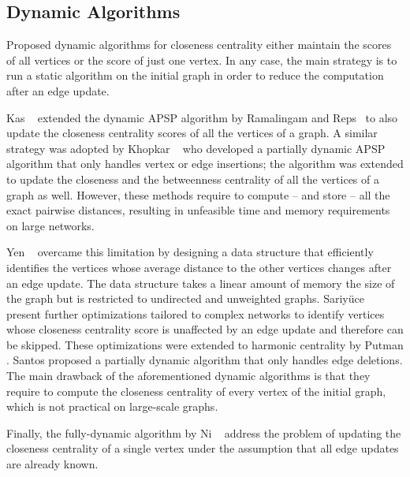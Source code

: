 \subsection{Dynamic Algorithms}
%
Proposed dynamic algorithms for closeness centrality either maintain the scores
of all vertices or the score of just one vertex. In any case, the main strategy is
to run a static algorithm on the initial graph in order to reduce the
computation after an edge update.

Kas \etal~\cite{DBLP:conf/asunam/KasCC13} extended the dynamic APSP algorithm by
Ramalingam and Reps~\cite{DBLP:journals/tcs/RamalingamR96} to also update the
closeness centrality scores of all the vertices of a graph.
A similar strategy was adopted by Khopkar \etal~\cite{DBLP:journals/snam/KhopkarNNB14}
who developed a partially dynamic APSP algorithm that only handles vertex or edge
insertions; the algorithm was extended to update the closeness and the
betweenness centrality of all the vertices of a graph as well.
However, these methods require to compute -- and store -- all the exact pairwise
distances, resulting in unfeasible time and memory requirements on large networks.

Yen \etal~\cite{DBLP:conf/icdm/YenYC13} overcame this limitation by designing a
data structure that efficiently identifies the vertices whose average distance
to the other vertices changes after an edge update. The data structure takes a
linear amount of memory \wrt the size of the graph but is restricted to
undirected and unweighted graphs.
%
Sariy\"uce
\etal~\cite{DBLP:conf/bigdataconf/SariyuceKSC13,DBLP:journals/pc/SariyuceSKC15,
DBLP:journals/corr/abs-1303-0422}
present further optimizations tailored to complex networks to identify
vertices whose closeness centrality score is unaffected by an edge update and
therefore can be skipped. These optimizations were extended to harmonic
centrality by Putman \etal \cite{DBLP:conf/asunam/PutmanBT19}.
Santos \etal \cite{DBLP:conf/ipps/SantosKMS16} proposed a partially
dynamic algorithm that only handles edge deletions.
The main drawback of the aforementioned dynamic algorithms is that they require
to compute the closeness centrality of every vertex of the initial graph,
which is not practical on large-scale graphs.

Finally, the fully-dynamic algorithm by Ni
\etal~\cite{DBLP:conf/asunam/NiHTC19} address the problem of updating the closeness
centrality of a single vertex under the assumption that all edge updates are
already known.

